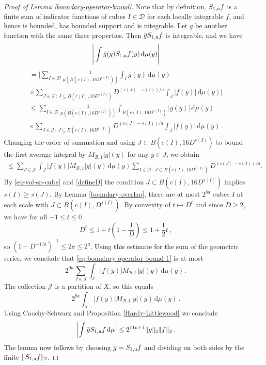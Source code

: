 {\begin{proof}[Proof of Lemma \ref{boundary-operator-bound}]
    Note that by definition, $S_{1,{\mathfrak u}}f$ is a finite sum of indicator functions of cubes $I \in \mathcal{D}$ for each locally integrable $f$, and hence is bounded, has bounded support and is integrable. Let $g$ be another function with the same three properties. Then $\bar g S_{1,{\mathfrak u}}f$ is integrable, and we have
    $$
        \Bigg|\int \bar g(y) S_{1,{\mathfrak u}}f(y) \, \mathrm{d}\mu(y)\Bigg|
    $$
    \begin{multline*}
        = \Bigg|\sum_{I\in\mathcal{D}} \frac{1}{\mu(B(c(I), 16 D^{s(I)}))} \int_I \bar g(y) \, \mathrm{d}\mu(y)\\
        \times \sum_{J\in \mathcal{J}\,:\,J\subseteq B(c(I), 16 D^{s(I)})} D^{(s(J)-s(I))/a}\int_J |f(y)| \,\mathrm{d}\mu(y)\Bigg|
    \end{multline*}
    \begin{multline*}
        \le \sum_{I\in\mathcal{D}} \frac{1}{\mu(B(c(I), 16D^{s(I)}))} \int_{B(c(I), 16D^{s(I)})} | g(y)| \, \mathrm{d}\mu(y)\\ \times \sum_{J\in \mathcal{J}\,:\,J\subseteq B(c(I), 16 D^{s(I)})} D^{(s(J)-s(I))/a}\int_J |f(y)| \,\mathrm{d}\mu(y)\,.
    \end{multline*}
    Changing the order of summation and using $J \subset B(c(I), 16 D^{s(I)})$ to bound the first average integral by $M_{\mathcal{B},1}|g|(y)$ for any $y \in J$, we obtain
    \begin{align}
    \label{eq-boundary-operator-bound-1}
        \le \sum_{J\in\mathcal{J}}\int_J|f(y)|  M_{\mathcal{B},1}|g|(y) \, \mathrm{d}\mu(y) \sum_{I \in \mathcal{D} \, : \, J\subset B(c(I),16 D^{s(I)})} D^{(s(J)-s(I))/a}.
    \end{align}
    By \eqref{eq-vol-sp-cube} and \eqref{defineD} the condition $J \subset B(c(I), 16 D^{s(I)})$ implies $s(I) \ge s(J)$. By Lemma \ref{boundary-overlap}, there are at most $2^{8a}$ cubes $I$ at each scale with $J \subset B(c(I), D^{s(I)})$.
    By convexity of $t \mapsto D^t$ and since $D \ge 2$, we have for all $-1 \le t \le 0$
    $$
        D^t \le 1 + t\left(1 - \frac{1}{D}\right) \le 1 + \frac{1}{2}t\,,
    $$
    so $(1 - D^{-1/a})^{-1} \le 2a \le 2^a$.
    Using this estimate for the sum of the geometric series,
    we conclude that \eqref{eq-boundary-operator-bound-1} is at most
    $$
        2^{9a} \sum_{J\in\mathcal{J}}\int_J|f(y)|  M_{\mathcal{B},1}|g|(y) \, \mathrm{d}\mu(y)\,.
    $$
    The collection $\mathcal{J}$ is a partition of $X$, so this equals
    $$
        2^{9a} \int_X|f(y)|  M_{\mathcal{B},1}|g|(y) \, \mathrm{d}\mu(y)\,.
    $$
    Using Cauchy-Schwarz and Proposition \ref{Hardy-Littlewood} we conclude
    $$
        \left|\int \bar g S_{1,{\mathfrak u}}f \, \mathrm{d}\mu \right| \le  2^{11a+1} \|g\|_2\|f\|_2\,.
    $$
    The lemma now follows by choosing $g = S_{1,{\mathfrak u}}f$ and dividing on both sides by the finite $\|S_{1,{\mathfrak u}}f\|_2$.
\end{proof}

}
